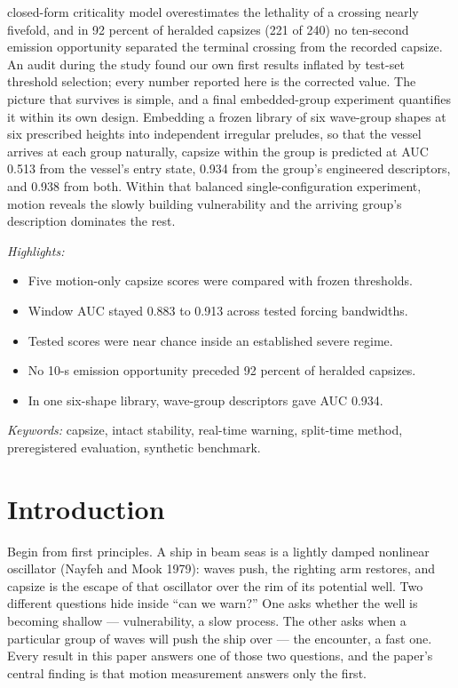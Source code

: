 \documentclass[11pt]{article}
\begin{document}
closed-form criticality model overestimates the lethality of a crossing nearly fivefold, and
in 92 percent of heralded capsizes (221 of 240) no ten-second emission opportunity separated
the terminal crossing from the recorded capsize. An audit during the study found our own first results inflated by test-set
threshold selection; every number reported here is the corrected value. The picture that
survives is simple, and a final embedded-group experiment quantifies it within its own design.
Embedding a frozen library of six wave-group shapes at six prescribed heights into independent
irregular preludes, so that the vessel arrives at each group naturally, capsize within the
group is predicted at AUC 0.513 from the vessel's entry state, 0.934 from the group's
engineered descriptors, and 0.938 from both. Within that balanced single-configuration
experiment, motion reveals the slowly building vulnerability and the arriving group's
description dominates the rest.

\emph{Highlights:}

\begin{itemize}\setlength{\itemsep}{1pt}\item Five motion-only capsize scores were compared with frozen thresholds.\item Window AUC stayed 0.883 to 0.913 across tested forcing bandwidths.\item Tested scores were near chance inside an established severe regime.\item No 10-s emission opportunity preceded 92 percent of heralded capsizes.\item In one six-shape library, wave-group descriptors gave AUC 0.934.\end{itemize}

\emph{Keywords:} capsize, intact stability, real-time warning, split-time method, preregistered
evaluation, synthetic benchmark.

\section{Introduction}

Begin from first principles. A ship in beam seas is a lightly damped nonlinear oscillator
(Nayfeh and Mook 1979): waves push, the righting arm restores, and capsize is the escape of
that oscillator over the rim of its potential well. Two different questions hide inside ``can we warn?'' One asks whether
the well is becoming shallow --- vulnerability, a slow process. The other asks when a particular
group of waves will push the ship over --- the encounter, a fast one. Every result in this paper
answers one of those two questions, and the paper's central finding is that motion measurement
answers only the first.
\end{document}
